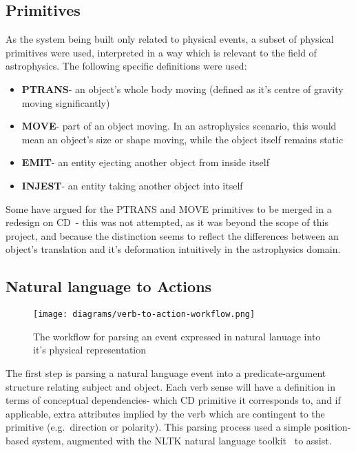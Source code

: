 \documentclass[dissertation.tex]{subfiles}
\begin{document}
    \subsection{Primitives}
    As the system being built only related to physical events, a subset of physical primitives were used, interpreted in a way which is relevant to the field of astrophysics. The following specific definitions were used:
    \begin{itemize}
        \item \textbf{PTRANS}- an object's whole body moving (defined as it's centre of gravity moving significantly)
        \item \textbf{MOVE}- part of an object moving. In an astrophysics scenario, this would mean an object's size or shape moving, while the object itself remains static %
        \item \textbf{EMIT}- an entity ejecting another object from inside itself
        \item \textbf{INJEST}- an entity taking another object into itself
    \end{itemize}

    Some have argued for the PTRANS and MOVE primitives to be merged in a redesign on CD~\cite{macbethimage}- this was not attempted, as it was beyond the scope of this project, and because the distinction seems to reflect the differences between an object's translation and it's deformation intuitively in the astrophysics domain.

    \subsection{Natural language to Actions}

    \begin{figure}[h]
        \begin{center}
            \texttt{[image: diagrams/verb-to-action-workflow.png]}
        \end{center}
        \caption{The workflow for parsing an event expressed in natural lanuage into it's physical representation}
    \end{figure}

    The first step is parsing a natural language event into a predicate-argument structure relating subject and object. Each verb sense will have a definition in terms of conceptual dependencies- which CD primitive it corresponds to, and if applicable, extra attributes implied by the verb which are contingent to the primitive (e.g.~direction or polarity). This parsing process used a simple position-based system, augmented with the NLTK natural language toolkit~\cite{bird2009nltk} to assist.
    
\end{document}
